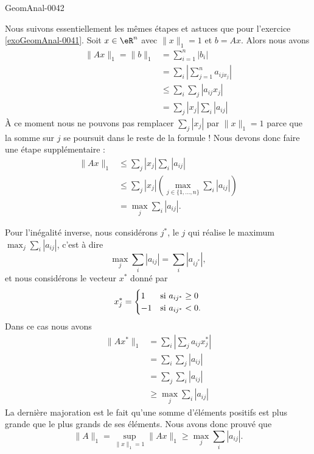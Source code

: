 \begin{corrige}{GeomAnal-0042}

    Nous suivons essentiellement les mêmes étapes et astuces que pour l'exercice \ref{exoGeomAnal-0041}. Soit \( x\in\eR^n\) avec \( \| x \|_1=1\) et \( b=Ax\). Alors nous avons
    \begin{subequations}
        \begin{align}
            \| Ax \|_1=\| b \|_1&=\sum_{i=1}^n| b_i |\\
            &=\sum_i\left| \sum_{j=1}^na_{ijx_j} \right| \\
            &\leq\sum_i\sum_j| a_{ij}x_j |\\
            &=\sum_j| x_j |\sum_i| a_{ij} |
        \end{align}
    \end{subequations}
    À ce moment nous ne pouvons pas remplacer \( \sum_j| x_j |\) par \( \| x \|_1=1\) parce que la somme sur \( j\) se poursuit dans le reste de la formule ! Nous devons donc faire une étape supplémentaire :
    \begin{subequations}
        \begin{align}
            \| Ax \|_1&\leq\sum_j| x_j |\sum_i| a_{ij} |\\
            &\leq\sum_j| x_j |\left( \max_{j\in\{ 1,\ldots,n \}}\sum_i| a_{ij} | \right)\\
            &=\max_j\sum_{i}| a_{ij} |.
        \end{align}
    \end{subequations}

    Pour l'inégalité inverse, nous considérons \( j^*\), le \( j\) qui réalise le maximum \( \max_j\sum_i| a_{ij} |\), c'est à dire
    \begin{equation}
        \max_j\sum_i| a_{ij} |=\sum_i| a_{ij^*} |,
    \end{equation}
    et nous considérons le vecteur \( x^*\) donné par
    \begin{equation}
        x^*_j=\begin{cases}
            1    &   \text{si \( a_{ij^*}\geq 0\)}\\
            -1    &    \text{si }a_{ij^*}<0.
        \end{cases}
    \end{equation}
    Dans ce cas nous avons
    \begin{subequations}
        \begin{align}
            \| Ax^* \|_1&=\sum_i\left| \sum_ja_{ij}x_j^* \right| \\
            &=\sum_i\sum_j| a_{ij} |\\
            &=\sum_{j}\sum_i| a_{ij} |\\
            &\geq\max_j\sum_i| a_{ij} |
        \end{align}
    \end{subequations}
    La dernière majoration est le fait qu'une somme d'éléments positifs est plus grande que le plus grands de ses éléments. Nous avons donc prouvé que
    \begin{equation}
        \| A \|_1=\sup_{\| x \|_1=1}\| Ax \|_1\geq\max_j\sum_i| a_{ij} |.
    \end{equation}

\end{corrige}
